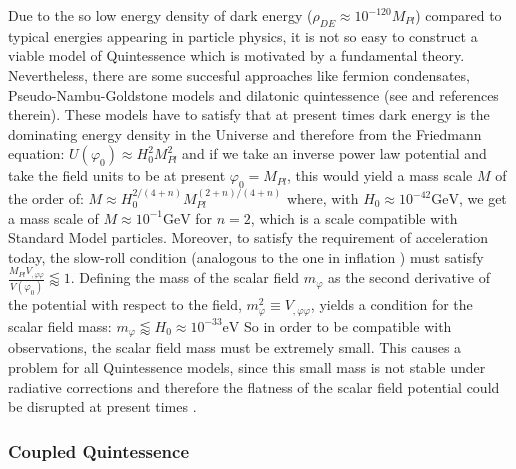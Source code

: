 Due to the so low energy density of dark energy ($\rho_{DE} \approx 10 ^{-120} M_{Pl}$)
compared to typical energies appearing in particle physics, it is not so easy to construct a 
viable model of Quintessence which is motivated by a fundamental theory. Nevertheless, there are 
some succesful approaches like fermion condensates, Pseudo-Nambu-Goldstone models and 
dilatonic quintessence (see \cite{amendola_dark_2010} and references therein).
These models have to satisfy that at present times dark energy is the dominating 
energy density in the Universe and therefore from the Friedmann equation:
\beeqc$
U(\varphi_0) \approx H_0^2 M_{Pl}^2
$
and if we take an inverse power law potential and take the field units to be at present $\varphi_0 = M_{Pl}$,
this would yield a mass scale $M$ of the order
of:
\beeqc$
M \approx H_0^{2/(4+n)} M_{Pl}^{(2+n)/(4+n)}
$
where, with $H_0 \approx 10^{-42} \mathrm{GeV} $, we get a mass scale of $M \approx 10^{-1} \mathrm{GeV}$
for $n=2$, which is a scale compatible with Standard Model particles.
Moreover, to satisfy the requirement of acceleration today, 
the slow-roll condition (analogous to the one in inflation \cite{infl}) must satisfy 
$ \frac{M_{Pl} V_{,\varphi \varphi}}{V(\varphi_0)} \lessapprox 1$.
Defining the mass of the scalar field $m_\varphi$ as the second derivative of the potential with respect to the field,
$m^2_\varphi \equiv  V_{,\varphi \varphi} $, yields a condition for the scalar field mass:
\beeqp$
m_\varphi \lessapprox H_0 \approx 10^{-33} \mathrm{eV}
$
So in order to be compatible with observations, 
the scalar field mass must be extremely small.
This causes a problem for all Quintessence models,
since this small mass is not stable under radiative corrections
and therefore the flatness of the scalar field potential could
be disrupted at present times \cite{Kolda, Lyth}.

\subsubsection{Coupled Quintessence \label{subsub:CQ}}

